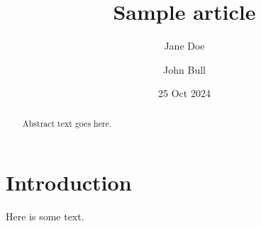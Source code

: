 \documentclass{amsart}
\title{Sample article}
\author{Jane Doe}
\author{John Bull}
\date{25 Oct 2024}
\begin{document}
\begin{abstract}
Abstract text goes here.
\end{abstract}


\maketitle


\section{Introduction}

Here is some text.
\end{document}
